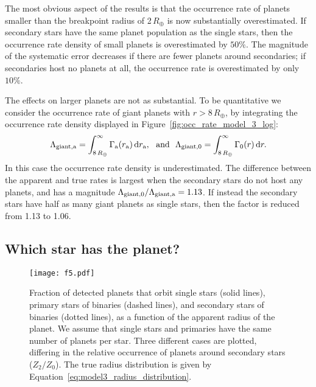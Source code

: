 \documentclass[12pt,modern,trackchanges]{aastex61}
\renewcommand{\a}{_{\rm a}}
\begin{document}
The most obvious aspect of the results is that the occurrence rate of
planets smaller than the breakpoint radius of 2\,$R_\oplus$ is now
substantially overestimated.  If secondary stars have the same planet
population as the single stars, then the occurrence rate density of
small planets is overestimated by $50\%$.  The magnitude of the
systematic error decreases if there are fewer planets around
secondaries; if secondaries host no planets at all, the occurrence
rate is overestimated by only $10\%$.

The effects on larger planets are not as substantial.  To be
quantitative we consider the occurrence rate of giant planets with
$r>8\,R_\oplus$, by integrating the occurrence rate density displayed
in Figure~\ref{fig:occ_rate_model_3_log}:
\begin{equation}
    \Lambda_{\rm giant,a} =
      \int_{8\,R_\oplus}^{\infty} \Gamma\a(r\a)\,{\rm d}r\a,~~{\rm
      and}~~
    \Lambda_{\rm giant,0} =
      \int_{8\,R_\oplus}^{\infty} \Gamma_0(r)\,{\rm d}r.
\end{equation}
In this case the occurrence rate density is underestimated.  The
difference between the apparent and true rates is largest when the
secondary stars do not host any planets, and has a magnitude
$\Lambda_{{\rm giant},0}/\Lambda_{\rm giant,a} = 1.13$.
If instead the secondary stars have half as many giant planets as single
stars, then the factor is reduced from 1.13 to 1.06.

\subsection{Which star has the planet?}
\label{subsec:whichstar}
\begin{figure}[!t]
    \centering
    \texttt{[image: f5.pdf]}
    \caption{ Fraction of detected planets that orbit single stars
      (solid lines), primary stars of binaries (dashed lines), and
      secondary stars of binaries (dotted lines), as a function of the
      apparent radius of the planet.  We assume that single stars and
      primaries have the same number of planets per star.  Three
      different cases are plotted, differing in the relative
      occurrence of planets around secondary stars ($Z_2/Z_0$).  The
      true radius distribution is given by
      Equation~\ref{eq:model3_radius_distribution}.}
    \label{fig:frac_model_3}
\end{figure}
\end{document}
